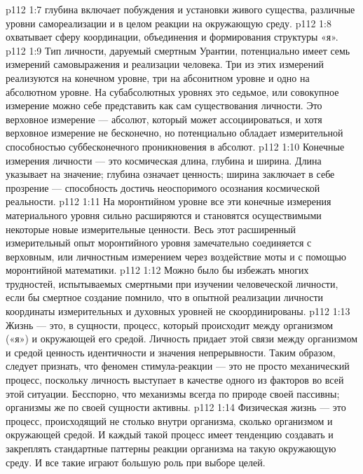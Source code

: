 \vs p112 1:7 \pc {}\bibnobreakspace {} глубина включает побуждения и установки живого существа, различные уровни самореализации и в целом реакции на окружающую среду.
\vs p112 1:8 \pc {}\bibnobreakspace {} охватывает сферу координации, объединения и формирования структуры «я».
\vs p112 1:9 \pc Тип личности, даруемый смертным Урантии, потенциально имеет семь измерений самовыражения и реализации человека. Три из этих измерений реализуются на конечном уровне, три на абсонитном уровне и одно на абсолютном уровне. На субабсолютных уровнях это седьмое, или совокупное измерение можно себе представить как сам  существования личности. Это верховное измерение --- абсолют, который может ассоциироваться, и хотя верховное измерение не бесконечно, но потенциально обладает измерительной способностью суббесконечного проникновения в абсолют.
\vs p112 1:10 Конечные измерения личности --- это космическая длина, глубина и ширина. Длина указывает на значение; глубина означает ценность; ширина заключает в себе прозрение --- способность достичь неоспоримого осознания космической реальности.
\vs p112 1:11 На моронтийном уровне все эти конечные измерения материального уровня сильно расширяются и становятся осуществимыми некоторые новые измерительные ценности. Весь этот расширенный измерительный опыт моронтийного уровня замечательно соединяется с верховным, или личностным измерением через воздействие моты и с помощью моронтийной математики.
\vs p112 1:12 Можно было бы избежать многих трудностей, испытываемых смертными при изучении человеческой личности, если бы смертное создание помнило, что в опытной реализации личности координаты измерительных и духовных уровней не скоординированы.
\vs p112 1:13 \pc Жизнь --- это, в сущности, процесс, который происходит между организмом («я») и окружающей его средой. Личность придает этой связи между организмом и средой ценность идентичности и значения непрерывности. Таким образом, следует признать, что феномен стимула\hyp{}реакции --- это не просто механический процесс, поскольку личность выступает в качестве одного из факторов во всей этой ситуации. Бесспорно, что механизмы всегда по природе своей пассивны; организмы же по своей сущности активны.
\vs p112 1:14 Физическая жизнь --- это процесс, происходящий не столько внутри организма, сколько  организмом и окружающей средой. И каждый такой процесс имеет тенденцию создавать и закреплять стандартные паттерны реакции организма на такую окружающую среду. И все такие  играют большую роль при выборе целей.
